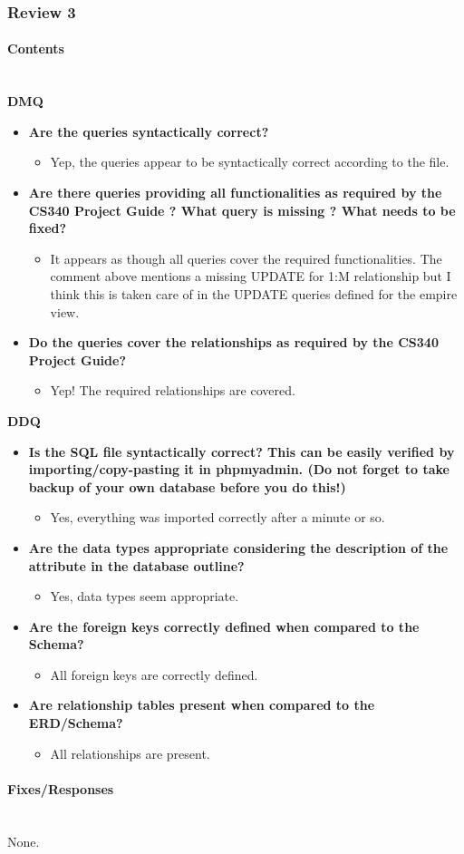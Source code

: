\documentclass[12pt]{article}
\newcommand{\hparagraph}[1]{\paragraph{#1}\mbox{}\vspace{0.75em}\\}
\begin{document}
\begin{appendices}
\subsubsection{Review 3}
\hparagraph{Contents}
\textbf{DMQ}
\begin{itemize}
    \item \textbf{Are the queries syntactically correct?}
    \begin{itemize}
        \item Yep, the queries appear to be syntactically correct according to the file.
    \end{itemize}
    \item \textbf{Are there queries providing all functionalities as required by the CS340 Project Guide ? What query is missing ? What needs to be fixed?}
    \begin{itemize}
        \item It appears as though all queries cover the required functionalities. The comment above mentions a missing UPDATE for 1:M relationship but I think this is taken care of in the UPDATE queries defined for the empire view.
    \end{itemize}
    \item \textbf{Do the queries cover the relationships as required by the CS340 Project Guide?}
    \begin{itemize}
        \item Yep! The required relationships are covered. 
    \end{itemize}
\end{itemize}
\textbf{DDQ}
\begin{itemize}
    \item \textbf{Is the SQL file syntactically correct? This can be easily verified by importing/copy-pasting it in phpmyadmin. (Do not forget to take backup of your own database before you do this!)}
    \begin{itemize}
        \item Yes, everything was imported correctly after a minute or so. 
    \end{itemize}
    \item \textbf{Are the data types appropriate considering the description of the attribute in the database outline?}
    \begin{itemize}
        \item Yes, data types seem appropriate.
    \end{itemize}
    \item \textbf{Are the foreign keys correctly defined when compared to the Schema?}
    \begin{itemize}
        \item All foreign keys are correctly defined.
    \end{itemize}
    \item \textbf{Are relationship tables present when compared to the ERD/Schema?}
    \begin{itemize}
        \item All relationships are present. 
    \end{itemize}
\end{itemize}
\hparagraph{Fixes/Responses}
None.


\end{appendices}
\end{document}
